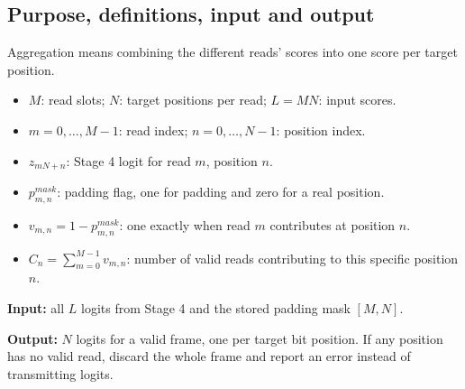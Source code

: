 \documentclass[11pt,a4paper]{article}
\begin{document}
\subsection*{Purpose, definitions, input and output}
Aggregation means combining the different reads' scores into one score per target position.
\begin{itemize}
\item $M$: read slots; $N$: target positions per read; $L=MN$: input scores.
\item $m=0,\ldots,M-1$: read index; $n=0,\ldots,N-1$: position index.
\item $z_{mN+n}$: Stage 4 logit for read $m$, position $n$.
\item $p^{mask}_{m,n}$: padding flag, one for padding and zero for a real position.
\item $v_{m,n}=1-p^{mask}_{m,n}$: one exactly when read $m$ contributes at position $n$.
\item $C_n=\sum_{m=0}^{M-1}v_{m,n}$: number of valid reads contributing to this specific position $n$.
\end{itemize}
\textbf{Input:} all $L$ logits from Stage 4 and the stored padding mask $[M,N]$.

\textbf{Output:} $N$ logits for a valid frame, one per target bit position. If any position has no valid read, discard the whole frame and report an error instead of transmitting logits.
\end{document}
